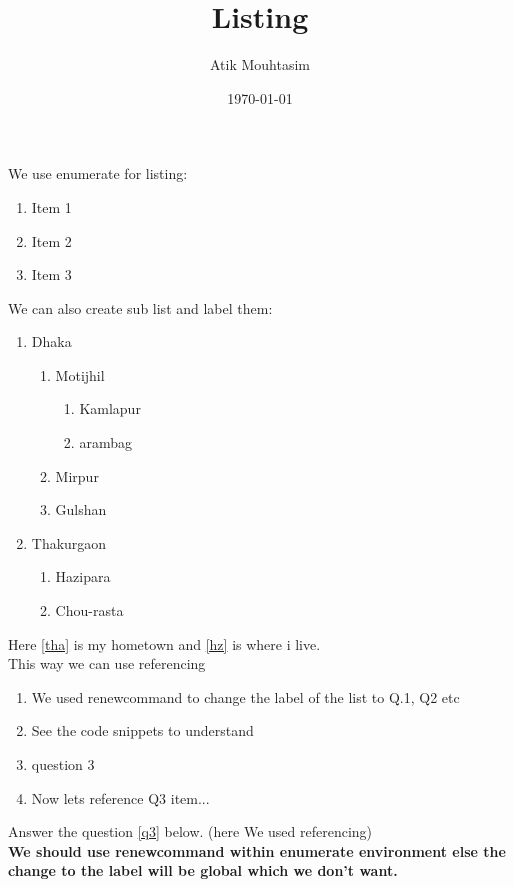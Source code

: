 \documentclass[12pt,a4paper]{article}
\title{Listing}
\author{Atik Mouhtasim}
\date{\today}
\begin{document}
\maketitle

We use enumerate for listing: \\
\begin{enumerate}
    \item Item 1
    \item Item 2
    \item Item 3
\end{enumerate}





We can also create sub list and label them:
\begin{enumerate}
    \item Dhaka \label{dhk}
    \begin{enumerate}
        \item Motijhil
        \begin{enumerate}
            \item Kamlapur
            \item arambag
        \end{enumerate}
        \item Mirpur
        \item Gulshan
    \end{enumerate}
    \item Thakurgaon \label{tha}
    \begin{enumerate}
        \item Hazipara \label{hz}
        \item Chou-rasta
    \end{enumerate}
\end{enumerate}
Here \ref{tha} is my hometown and \ref{hz} is where i live. \\  
This way we can use referencing \\




\begin{enumerate}
    \renewcommand{\labelenumi}{Q.\theenumi}
    \item We used renewcommand to change the label of the list to Q.1, Q2 etc
    \item See the code snippets to understand
    \item question 3 \label{q3}
    \item Now lets reference Q3 item...
\end{enumerate}
Answer the question \ref{q3} below. (here We used referencing) \\
\textbf{We should use renewcommand within enumerate environment else the change to the label will be global which we don't want.} \\ \\
 
\end{document}
